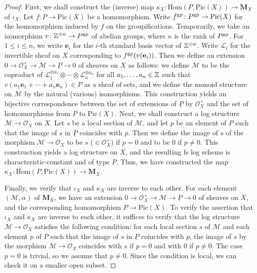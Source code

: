 \begin{proof}
  First, we shall construct the (inverse) map $\kappa_X \colon \mathrm{Hom}(P, \mathrm{Pic}(X)) \to \mathbf{M}_X$ of $\iota_X$. Let $f \colon P \to \mathrm{Pic}(X)$ be a homomorphism. Write $f^{\mathrm{gp}} \colon P^{\mathrm{gp}} \to \mathrm{Pic}(X)$ for the homomorphism induced by $f$ on the groupifications. Temporarily, we take an isomorphism $v \colon \mathbb{Z}^{\oplus n} \to P^{\mathrm{gp}}$ of abelian groups, where $n$ is the rank of $P^{\mathrm{gp}}$. For $1 \leq i \leq n$, we write $\mathbf{e}_i$ for the $i$-th standard basis vector of $\mathbb{Z}^{\oplus n}$. Write $\mathcal{L}_i$ for the invertible sheaf on $X$ corresponding to $f^{\mathrm{gp}}(v(\mathbf{e}_i))$. Then we define an extension $0 \to \mathcal{O}_X^\times \to \mathcal{M} \to \underline{P} \to 0$ of sheaves on $X$ as follows: we define $\mathcal{M}$ to be the coproduct of $\mathcal{L}_1^{\otimes a_1} \otimes \cdots \otimes \mathcal{L}_n^{\otimes a_n}$ for all $a_1, \ldots, a_n \in \mathbb{Z}$ such that $v(a_1 \mathbf{e}_1 + \cdots + a_n \mathbf{e}_n) \in P$ as a sheaf of sets, and we define the monoid structure on $\mathcal{M}$ by the natural (various) isomorphisms. This construction yields an bijective correspondence between the set of extensions of $\underline{P}$ by $\mathcal{O}_X^\times$ and the set of homomorphisms from $P$ to $\mathrm{Pic}(X)$. Next, we shall construct a log structure $\mathcal{M} \to \mathcal{O}_X$ on $X$. Let $s$ be a local section of $\mathcal{M}$, and let $p$ be an element of $P$ such that the image of $s$ in $\underline{P}$ coincides with $p$. Then we define the image of $s$ of the morphism $\mathcal{M} \to \mathcal{O}_X$ to be $s$ ($\in \mathcal{O}_X^\times$) if $p = 0$ and to be $0$ if $p \neq 0$. This construction yields a log structure on $X$, and the resulting fs log scheme is characteristic-constant and of type $P$. Thus, we have constructed the map $\kappa_X \colon \mathrm{Hom}(P, \mathrm{Pic}(X)) \to \mathbf{M}_X$.

  Finally, we verify that $\iota_X$ and $\kappa_X$ are inverse to each other. For each element $(\mathcal{M}, \alpha)$ of $\mathbf{M}_X$, we have an extension $0 \to \mathcal{O}_X^\times \to \mathcal{M} \to \underline{P} \to 0$ of sheaves on $X$, and the corresponding homomorphism $P \to \mathrm{Pic}(X)$. To verify the assertion that $\iota_X$ and $\kappa_X$ are inverse to each other, it suffices to verify that the log structure $\mathcal{M} \to \mathcal{O}_X$ satisfies the following condition: for each local section $s$ of $\mathcal{M}$ and each element $p$ of $P$ such that the image of $s$ in $\underline{P}$ coincides with $p$, the image of $s$ by the morphism $\mathcal{M} \to \mathcal{O}_X$ coincides with $s$ if $p = 0$ and with $0$ if $p \neq 0$. The case $p = 0$ is trivial, so we assume that $p \neq 0$. Since the condition is local, we can check it on a smaller open subset.


\end{proof}
